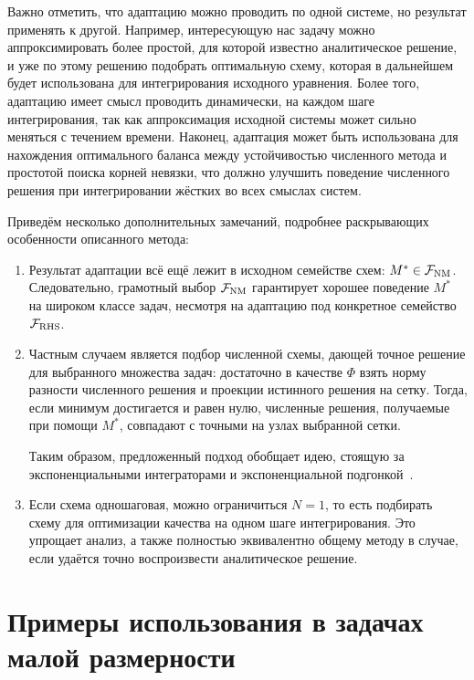 Важно отметить, что адаптацию можно проводить по одной системе, но результат применять к другой.
Например, интересующую нас задачу можно аппроксимировать более простой,
для которой известно аналитическое решение, и уже по этому решению подобрать оптимальную схему,
которая в дальнейшем будет использована для интегрирования исходного уравнения.
Более того, адаптацию имеет смысл проводить динамически, на каждом шаге интегрирования,
так как аппроксимация исходной системы может сильно меняться с течением времени.
Наконец, адаптация может быть использована для нахождения оптимального баланса
между устойчивостью численного метода и простотой поиска корней невязки,
что должно улучшить поведение численного решения при интегрировании жёстких во всех смыслах систем.

Приведём несколько дополнительных замечаний, подробнее раскрывающих особенности описанного метода:
\begin{enumerate}
    \item
        Результат адаптации всё ещё лежит в исходном семействе схем: $ M^* \in \mathcal{F}_{\textnormal{NM}} $.
        Следовательно, грамотный выбор $ \mathcal{F}_{\textnormal{NM}} $ гарантирует хорошее поведение $ M^* $
        на широком классе задач, несмотря на адаптацию под конкретное семейство $ \mathcal{F}_{\textnormal{RHS}} $.

    \item
        Частным случаем является подбор численной схемы,
        дающей точное решение для выбранного множества задач:
        достаточно в качестве $ \Phi $ взять норму разности численного решения и проекции истинного решения на сетку.
        Тогда, если минимум достигается и равен нулю,
        численные решения, получаемые при помощи $ M^* $, совпадают с точными на узлах выбранной сетки.

        Таким образом, предложенный подход обобщает идею, стоящую за экспоненциальными интеграторами
        и экспоненциальной подгонкой~\cite{liniger1970efficient_integration_methods, lambert1991methods, hollevoet2013exponential_fitting}.

    \item
        Если схема одношаговая, можно ограничиться $ N = 1 $,
        то есть подбирать схему для оптимизации качества на одном шаге интегрирования.
        Это упрощает анализ, а также полностью эквивалентно общему методу в случае,
        если удаётся точно воспроизвести аналитическое решение.
\end{enumerate}


\section{Примеры использования в задачах малой размерности}
\label{section:methods:low_dimensional_examples}

